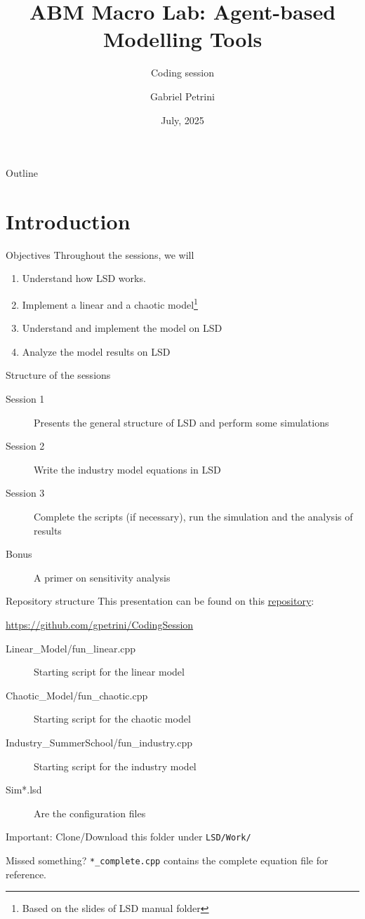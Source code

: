 \documentclass[bigger,aspectratio=169]{beamer}
\author{Gabriel Petrini}
\date{July, 2025}
\title{ABM Macro Lab: Agent-based Modelling Tools}
\subtitle{Coding session}
\begin{document}
\maketitle
\begin{frame}{Outline}
\tableofcontents
\end{frame}

\section{Introduction}
\label{sec:org4988304}

\begin{frame}[label={sec:orgfc224df}]{Objectives}
Throughout the sessions, we will

\begin{enumerate}
\item Understand how LSD works.
\item Implement a linear and a chaotic model\footnote{Based on the slides of LSD manual folder}
\item Understand and implement the \textcite{dosi_2017_footprint} model on LSD
\item Analyze the model results on LSD
\end{enumerate}
\end{frame}
\begin{frame}[label={sec:org141ffbb}]{Structure of the sessions}
\begin{description}
\item[{Session 1}] Presents the general structure of LSD and perform some simulations
\item[{Session 2}] Write the industry model equations in LSD
\item[{Session 3}] Complete the scripts (if necessary), run the simulation and the analysis of results
\item[{Bonus}] A primer on sensitivity analysis
\end{description}
\end{frame}
\begin{frame}[label={sec:orgb627b5c},fragile]{Repository structure}
 This presentation can be found on this \href{https://github.com/gpetrini/CodingSession}{repository}:

\url{https://github.com/gpetrini/CodingSession}

\begin{description}
\item[{Linear\_Model/fun\_linear.cpp}] Starting script for the linear model
\item[{Chaotic\_Model/fun\_chaotic.cpp}] Starting script for the chaotic model
\item[{Industry\_SummerSchool/fun\_industry.cpp}] Starting script for the industry model
\item[{Sim*.lsd}] Are the configuration files
\end{description}

\alert{Important:} Clone/Download this folder under \texttt{LSD/Work/}
\begin{block}{Missed something?}
\texttt{*\_complete.cpp} contains the complete equation file for reference.
\end{block}
\end{frame}
\end{document}
